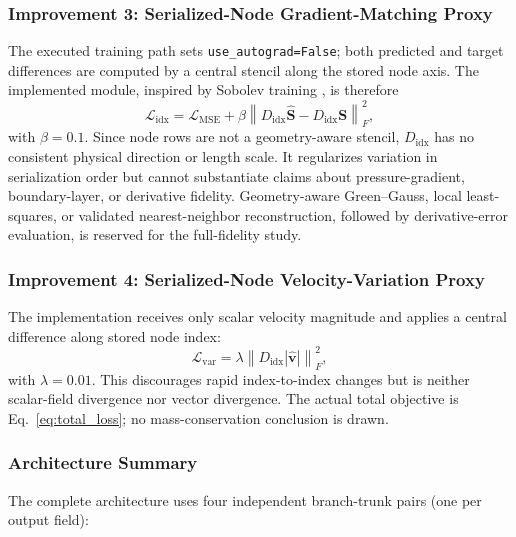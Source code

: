 \documentclass[journal]{IEEEtran}
\newcommand{\added}[1]{#1}
\begin{document}
\subsubsection{Improvement 3: Serialized-Node Gradient-Matching Proxy}
 \added{The executed training path sets \texttt{use\_autograd=False}; both predicted and target differences are computed by a central stencil along the stored node axis. The implemented module, inspired by Sobolev training \cite{son2021sobolev}, is therefore}
    {
\begin{equation}
\mathcal{L}_\text{idx} = \mathcal{L}_\text{MSE}
 + \beta\left\|D_\text{idx}\hat{\bm S}-D_\text{idx}\bm S\right\|_F^2,
\label{eq:sobolev}
\end{equation}}
\added{with $\beta=0.1$. Since node rows are not a geometry-aware stencil, $D_\text{idx}$ has no consistent physical direction or length scale. It regularizes variation in serialization order but cannot substantiate claims about pressure-gradient, boundary-layer, or derivative fidelity. Geometry-aware Green--Gauss, local least-squares, or validated nearest-neighbor reconstruction, followed by derivative-error evaluation, is reserved for the full-fidelity study.}

\subsubsection{Improvement 4: Serialized-Node Velocity-Variation Proxy}
 \added{The implementation receives only scalar velocity magnitude and applies a central difference along stored node index:}
    {
\begin{equation}
\mathcal{L}_\text{var} = \lambda\left\|D_\text{idx}|\hat{\bm v}|\right\|_F^2,
\label{eq:div}
\end{equation}}
\added{with $\lambda=0.01$. This discourages rapid index-to-index changes but is neither scalar-field divergence nor vector divergence. The actual total objective is Eq.~\eqref{eq:total_loss}; no mass-conservation conclusion is drawn.}

\subsubsection{Architecture Summary}
The complete architecture uses four independent branch-trunk pairs (one per output field):
\end{document}
